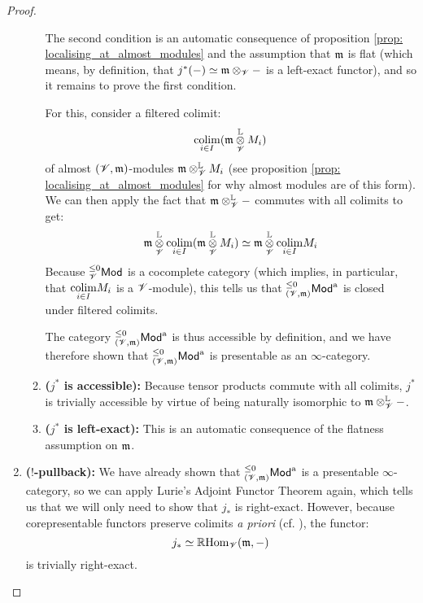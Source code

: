 \begin{proof}
\begin{enumerate}
\begin{enumerate}
                                            The second condition is an automatic consequence of proposition \ref{prop: localising_at_almost_modules} and the assumption that $\mathfrak{m}$ is flat (which means, by definition, that $j^*(-) \cong \m \tensor_{\scrV} -$ is a left-exact functor), and so it remains to prove the first      condition. 
                                            
                                            For this, consider a filtered colimit:
                                                $$\underset{i \in I}{\colim} (\m \tensor_{\scrV}^{\L} M_i)$$
                                            of almost $(\mathscr{V}, \mathfrak{m})$-modules $\m \tensor_{\scrV}^{\L} M_i$ (see proposition \ref{prop: localising_at_almost_modules} for why almost modules are of this form). We can then apply the fact that $\m \tensor_{\scrV}^{\L} -$ commutes with all colimits to get:
                                                $$\m \tensor_{\scrV}^{\L} \underset{i \in I}{\colim} (\m \tensor_{\scrV}^{\L} M_i) \cong \m \tensor_{\scrV}^{\L} \underset{i \in I}{\colim} M_i$$
                                            Because ${}_{\mathscr{V}}^{\leq 0}\mathsf{Mod}$ is a cocomplete category (which implies, in particular, that $\underset{i \in I}{\operatorname{colim}} M_i$ is a $\mathscr{V}$-module), this tells us that ${}_{(\mathscr{V}, \mathfrak{m})}^{\leq 0}\mathsf{Mod}^{\mathrm{a}}$ is closed under filtered colimits. 
                                            
                                            The category ${}_{(\mathscr{V}, \mathfrak{m})}^{\leq 0}\mathsf{Mod}^{\mathrm{a}}$ is thus accessible by definition, and we have therefore shown that ${}_{(\mathscr{V}, \mathfrak{m})}^{\leq 0}\mathsf{Mod}^{\mathrm{a}}$ is presentable as an $\infty$-category.
                                            \item \textbf{($j^*$ is accessible):} Because tensor products commute with all colimits, $j^*$ is trivially accessible by virtue of being naturally isomorphic to $\m \tensor_{\scrV}^{\L} -$. 
                                            \item \textbf{($j^*$ is left-exact):} This is an automatic consequence of the flatness assumption on $\mathfrak{m}$.
                                        \end{enumerate}
                                    \item \textbf{($!$-pullback):} We have already shown that ${}_{(\mathscr{V}, \mathfrak{m})}^{\leq 0}\mathsf{Mod}^{\mathrm{a}}$ is a presentable $\infty$-category, so we can apply Lurie's Adjoint Functor Theorem again, which tells us that we will only need to show that $j_*$ is right-exact. However, because corepresentable functors preserve colimits \textit{a priori} (cf. \cite{nlab:hom-functor_preserves_limits}), the functor:
                                        $$j_* \simeq \mathbb{R}\mathrm{Hom}_{\mathscr{V}}(\mathfrak{m}, -)$$
                                    is trivially right-exact.
                                \end{enumerate}
                        \end{proof}
                        
